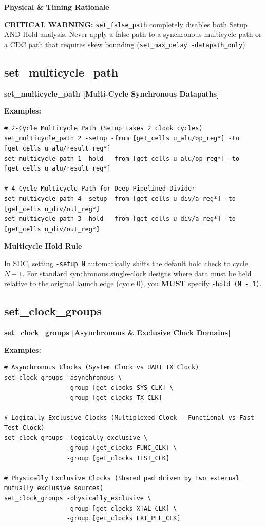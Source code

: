 \documentclass[11pt,a4paper]{article}
\newenvironment{cmdbox}[2]{%
  \begin{mdframed}[style=cmdstyle]%
  {\bfseries\sffamily\color{primary}#1 \hfill \footnotesize\color{mutedgray}[#2]}\par\vspace{3pt}%
}{%
  \end{mdframed}%
}
\newenvironment{physbox}{%
  \begin{mdframed}[style=physstyle]%
  {\bfseries\sffamily\color{darktext}\small Physical \& Timing Rationale}\par\vspace{2pt}\small%
}{%
  \end{mdframed}%
}
\newenvironment{formulabox}[1]{%
  \begin{mdframed}[style=formstyle]%
  {\bfseries\sffamily\color{primary}\small #1}\par\vspace{2pt}\small%
}{%
  \end{mdframed}%
}
\begin{document}
\begin{physbox}
\textbf{CRITICAL WARNING:} \texttt{set\_false\_path} completely disables both Setup AND Hold analysis. Never apply a false path to a synchronous multicycle path or a CDC path that requires skew bounding (\texttt{set\_max\_delay -datapath\_only}).
\end{physbox}

\subsection{set\_multicycle\_path}
\begin{cmdbox}{set\_multicycle\_path}{Multi-Cycle Synchronous Datapaths}
\textbf{Examples:}
\begin{lstlisting}[style=sdcstyle]
# 2-Cycle Multicycle Path (Setup takes 2 clock cycles)
set_multicycle_path 2 -setup -from [get_cells u_alu/op_reg*] -to [get_cells u_alu/result_reg*]
set_multicycle_path 1 -hold  -from [get_cells u_alu/op_reg*] -to [get_cells u_alu/result_reg*]

# 4-Cycle Multicycle Path for Deep Pipelined Divider
set_multicycle_path 4 -setup -from [get_cells u_div/a_reg*] -to [get_cells u_div/out_reg*]
set_multicycle_path 3 -hold  -from [get_cells u_div/a_reg*] -to [get_cells u_div/out_reg*]
\end{lstlisting}
\end{cmdbox}

\begin{formulabox}{Multicycle Hold Rule}
In SDC, setting \texttt{-setup N} automatically shifts the default hold check to cycle $N-1$. For standard synchronous single-clock designs where data must be held relative to the original launch edge (cycle 0), you \textbf{MUST} specify \texttt{-hold (N - 1)}.
\end{formulabox}

\subsection{set\_clock\_groups}
\begin{cmdbox}{set\_clock\_groups}{Asynchronous \& Exclusive Clock Domains}
\textbf{Examples:}
\begin{lstlisting}[style=sdcstyle]
# Asynchronous Clocks (System Clock vs UART TX Clock)
set_clock_groups -asynchronous \
                 -group [get_clocks SYS_CLK] \
                 -group [get_clocks TX_CLK]

# Logically Exclusive Clocks (Multiplexed Clock - Functional vs Fast Test Clock)
set_clock_groups -logically_exclusive \
                 -group [get_clocks FUNC_CLK] \
                 -group [get_clocks TEST_CLK]

# Physically Exclusive Clocks (Shared pad driven by two external mutually exclusive sources)
set_clock_groups -physically_exclusive \
                 -group [get_clocks XTAL_CLK] \
                 -group [get_clocks EXT_PLL_CLK]
\end{lstlisting}
\end{cmdbox}
\end{document}
